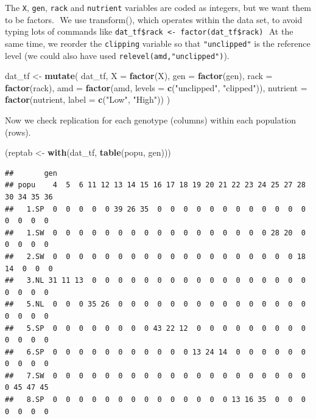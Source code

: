 \documentclass[
  12pt,
]{book}
\newenvironment{Shaded}{\begin{snugshade}}{\end{snugshade}}
\newcommand{\DataTypeTok}[1]{\textcolor[rgb]{0.13,0.29,0.53}{#1}}
\newcommand{\KeywordTok}[1]{\textcolor[rgb]{0.13,0.29,0.53}{\textbf{#1}}}
\newcommand{\NormalTok}[1]{#1}
\newcommand{\StringTok}[1]{\textcolor[rgb]{0.31,0.60,0.02}{#1}}
\begin{document}
The \texttt{X}, \texttt{gen}, \texttt{rack} and \texttt{nutrient} variables are coded as integers, but we want them to be factors.
 We use transform(), which operates within the data set, to avoid typing lots of commands like \texttt{dat\_tf\$rack\ \textless{}-\ factor(dat\_tf\$rack)}
 At the same time, we reorder the \texttt{clipping} variable so that \texttt{"unclipped"} is the reference level (we could also have used \texttt{relevel(amd,"unclipped")}).

\begin{Shaded}
\begin{Highlighting}[]
\NormalTok{dat_tf <-}\StringTok{ }\KeywordTok{mutate}\NormalTok{(}
\NormalTok{  dat_tf,}
  \DataTypeTok{X =} \KeywordTok{factor}\NormalTok{(X),}
  \DataTypeTok{gen =} \KeywordTok{factor}\NormalTok{(gen),}
  \DataTypeTok{rack =} \KeywordTok{factor}\NormalTok{(rack),}
  \DataTypeTok{amd =} \KeywordTok{factor}\NormalTok{(amd, }\DataTypeTok{levels =} \KeywordTok{c}\NormalTok{(}\StringTok{"unclipped"}\NormalTok{, }\StringTok{"clipped"}\NormalTok{)),}
  \DataTypeTok{nutrient =} \KeywordTok{factor}\NormalTok{(nutrient, }\DataTypeTok{label =} \KeywordTok{c}\NormalTok{(}\StringTok{"Low"}\NormalTok{, }\StringTok{"High"}\NormalTok{))}
\NormalTok{)}
\end{Highlighting}
\end{Shaded}

Now we check replication for each genotype (columns) within each population (rows).

\begin{Shaded}
\begin{Highlighting}[]
\NormalTok{(reptab <-}\StringTok{ }\KeywordTok{with}\NormalTok{(dat_tf, }\KeywordTok{table}\NormalTok{(popu, gen)))}
\end{Highlighting}
\end{Shaded}

\begin{verbatim}
##       gen
## popu    4  5  6 11 12 13 14 15 16 17 18 19 20 21 22 23 24 25 27 28 30 34 35 36
##   1.SP  0  0  0  0  0 39 26 35  0  0  0  0  0  0  0  0  0  0  0  0  0  0  0  0
##   1.SW  0  0  0  0  0  0  0  0  0  0  0  0  0  0  0  0  0 28 20  0  0  0  0  0
##   2.SW  0  0  0  0  0  0  0  0  0  0  0  0  0  0  0  0  0  0  0 18 14  0  0  0
##   3.NL 31 11 13  0  0  0  0  0  0  0  0  0  0  0  0  0  0  0  0  0  0  0  0  0
##   5.NL  0  0  0 35 26  0  0  0  0  0  0  0  0  0  0  0  0  0  0  0  0  0  0  0
##   5.SP  0  0  0  0  0  0  0  0 43 22 12  0  0  0  0  0  0  0  0  0  0  0  0  0
##   6.SP  0  0  0  0  0  0  0  0  0  0  0 13 24 14  0  0  0  0  0  0  0  0  0  0
##   7.SW  0  0  0  0  0  0  0  0  0  0  0  0  0  0  0  0  0  0  0  0  0 45 47 45
##   8.SP  0  0  0  0  0  0  0  0  0  0  0  0  0  0 13 16 35  0  0  0  0  0  0  0
\end{verbatim}
\end{document}
